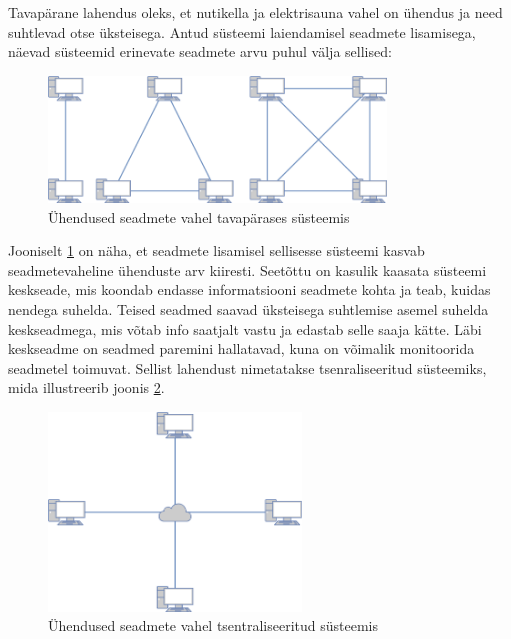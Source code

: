 \documentclass[12pt]{article}
\begin{document}
  Tavapärane lahendus oleks, et nutikella ja elektrisauna vahel on ühendus ja
  need suhtlevad otse üksteisega. Antud süsteemi laiendamisel seadmete lisamisega,
  näevad süsteemid erinevate seadmete arvu puhul välja sellised:
  

  \begin{figure} [ht] %
  \begin{center}
  \includegraphics[width=0.8\textwidth]{decentralizedCommunication}
  \caption{Ühendused seadmete vahel tavapärases süsteemis}
  \label{fig:decentralizedCommunication}
  \end{center}
  \end{figure}
  \FloatBarrier
  
  
  Jooniselt \ref{fig:decentralizedCommunication} on näha, et seadmete lisamisel sellisesse
  süsteemi kasvab seadmetevaheline ühenduste arv kiiresti. 
  Seetõttu on kasulik kaasata süsteemi keskseade, mis koondab endasse informatsiooni seadmete kohta
  ja teab, kuidas nendega suhelda. Teised seadmed saavad üksteisega suhtlemise asemel suhelda
  keskseadmega, mis võtab info saatjalt vastu ja edastab selle saaja kätte.
  Läbi keskseadme on seadmed paremini hallatavad, kuna on võimalik monitoorida seadmetel
  toimuvat.
  Sellist lahendust nimetatakse tsenraliseeritud süsteemiks, mida illustreerib joonis
  \ref{fig:centralizedCommunication}.

  \begin{figure} [ht] %
  \begin{center}
  \includegraphics[width=0.6\textwidth]{centralizedCommunication}
  \caption{Ühendused seadmete vahel tsentraliseeritud süsteemis}
  \label{fig:centralizedCommunication}
  \end{center}
  \end{figure}
  \FloatBarrier
  
\end{document}
